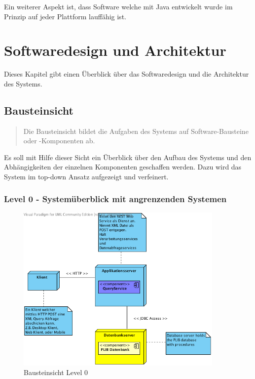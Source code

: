 Ein weiterer Aspekt ist, dass Software welche mit Java entwickelt wurde im Prinzip auf jeder Plattform lauffähig ist. 

\section{Softwaredesign und Architektur}

Dieses Kapitel gibt einen Überblick über das Softwaredesign und die Architektur des Systems. 

\subsection{Bausteinsicht}
\begin{quotation}
Die Bausteinsicht bildet die Aufgaben des Systems auf Software-Bausteine oder -Komponenten ab.
 \citep[S. 98ff][]{starke}	
\end{quotation}

Es soll mit Hilfe dieser Sicht ein Überblick über den Aufbau des Systems und den Abhängigkeiten der einzelnen Komponenten geschaffen werden. Dazu wird das System im top-down Ansatz aufgezeigt und verfeinert. 

\subsubsection{Level 0 - Systemüberblick mit angrenzenden Systemen} 

\begin{figure}[htbp]
	\centering
		\includegraphics[width=0.9\textwidth]{images/bausteinsicht_plib_level0.png}
	\caption{Bausteinsicht Level 0}
	\label{fig:bausteinsicht_level0}
\end{figure}

